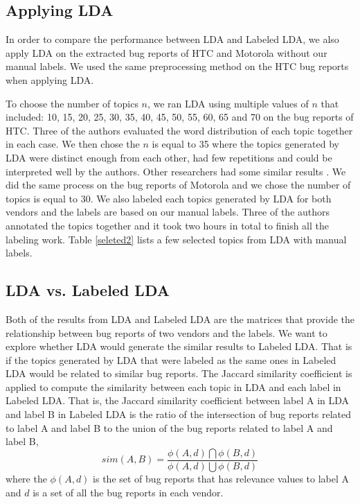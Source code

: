 \documentclass[10pt, conference, compsocconf]{IEEEtran}
\begin{document}


\subsection{Applying LDA}
In order to compare the performance between LDA and Labeled LDA, we also apply LDA on the extracted bug reports of HTC and Motorola without our manual labels. We used the same preprocessing method on the HTC bug reports when applying LDA. 

To choose the number of topics $n$, we ran LDA using multiple values of $n$ that included: 10, 15, 20, 25, 30, 35, 40, 45, 50, 55, 60, 65 and 70 on the bug reports of HTC. Three of the authors evaluated the word distribution of each topic together in each case. We then chose the $n$ is equal to 35 where the topics generated by LDA were distinct enough from each other, had few repetitions and could be interpreted well by the authors. Other researchers had some similar results \cite{Thomas:2011} \cite{Hindle}. We did the same process on the bug reports of Motorola and we chose the number of topics is equal to 30. We also labeled each topics generated by LDA for both vendors and the labels are based on our manual labels. Three of the authors annotated the topics together and it took two hours in total to finish all the labeling work. Table \ref{seleted2} lists a few selected topics from LDA with manual labels.


\subsection{LDA vs. Labeled LDA}
Both of the results from LDA and Labeled LDA are the matrices that provide the relationship between bug reports of two vendors and the labels. We want to explore whether LDA would generate the similar results to Labeled LDA. That is if the topics generated by LDA that were labeled as the same ones in Labeled LDA would be related to similar bug reports.
The Jaccard similarity coefficient is applied to compute the similarity between each topic in LDA and each label in Labeled LDA. That is, the Jaccard similarity coefficient between label A in LDA and label B in Labeled LDA is the ratio of the intersection of bug reports related to label A and label B to the union of the bug reports related to label A and label B,
\begin{equation}
sim(A,B) = \frac{\phi(A,d)\bigcap\phi(B,d)}{\phi(A,d)\bigcup\phi(B,d)}
\end{equation}
where the $\phi(A,d)$ is the set of bug reports that has relevance values to label A and $d$ is a set of all the bug reports in each vendor.
\end{document}

